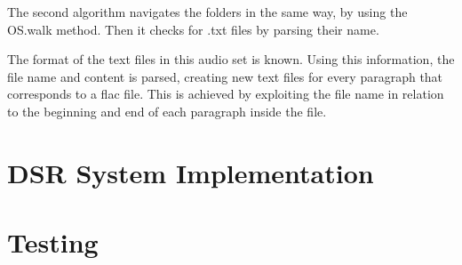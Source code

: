 

The second algorithm navigates the folders in the same way, by using the OS.walk method. Then it checks for .txt files by parsing their name. 



The format of the text files in this audio set is known. Using this information, the file name and content is parsed, creating new text files for every paragraph that corresponds to a flac file. This is achieved by exploiting the file name in relation to the beginning and end of each paragraph inside the file.
 
 
 
\section{DSR System Implementation}

\section{Testing}










